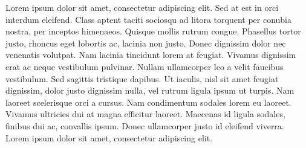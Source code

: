Lorem ipsum dolor sit amet, consectetur adipiscing elit. Sed at est in
orci interdum eleifend. Class aptent taciti sociosqu ad litora torquent
per conubia nostra, per inceptos himenaeos. Quisque mollis rutrum
congue. Phasellus tortor justo, rhoncus eget lobortis ac, lacinia non
justo. Donec dignissim dolor nec venenatis volutpat. Nam lacinia
tincidunt lorem at feugiat. Vivamus dignissim erat ac neque vestibulum
pulvinar. Nullam ullamcorper leo a velit faucibus vestibulum. Sed
sagittis tristique dapibus. Ut iaculis, nisl sit amet feugiat dignissim,
dolor justo dignissim nulla, vel rutrum ligula ipsum ut turpis. Nam
laoreet scelerisque orci a cursus. Nam condimentum sodales lorem eu
laoreet. Vivamus ultricies dui at magna efficitur laoreet. Maecenas id
ligula sodales, finibus dui ac, convallis ipsum. Donec ullamcorper justo
id eleifend viverra. Lorem ipsum dolor sit amet, consectetur adipiscing
elit.
